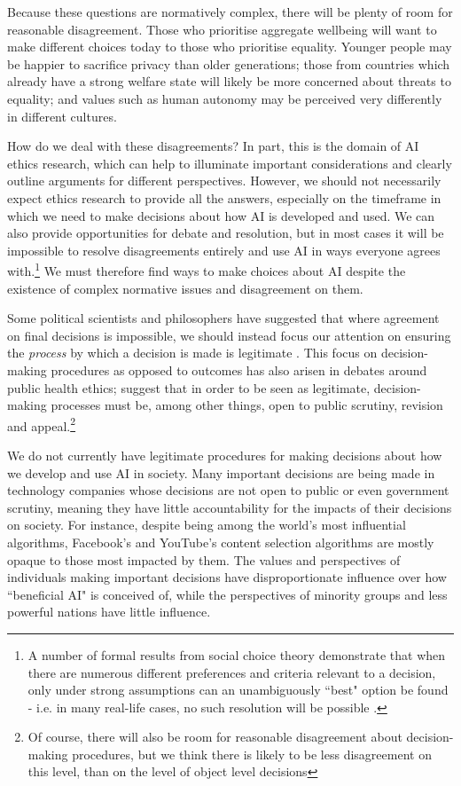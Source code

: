 \documentclass{article}
\begin{document}
Because these questions are normatively complex, there will be plenty of room for reasonable disagreement. Those who prioritise aggregate wellbeing will want to make different choices today to those who prioritise equality. Younger people may be happier to sacrifice privacy than older generations; those from countries which already have a strong welfare state will likely be more concerned about threats to equality; and values such as human autonomy may be perceived very differently in different cultures.

How do we deal with these disagreements? In part, this is the domain of AI ethics research, which can help to illuminate important considerations and clearly outline arguments for different perspectives. However, we should not necessarily expect ethics research to provide all the answers, especially on the timeframe in which we need to make decisions about how AI is developed and used. We can also provide opportunities for debate and resolution, but in most cases it will be impossible to resolve disagreements entirely and use AI in ways everyone agrees with.\footnote{A number of formal results from social choice theory demonstrate that when there are numerous different preferences and criteria relevant to a decision, only under strong assumptions can an unambiguously ``best" option be found - i.e. in many real-life cases, no such resolution will be possible \citep{patty_social_2014}.} We must therefore find ways to make choices about AI despite the existence of complex normative issues and disagreement on them.


Some political scientists and philosophers have suggested that where agreement on final decisions is impossible, we should instead focus our attention on ensuring the \textit{process} by which a decision is made is legitimate \citep{patty_social_2014}. This focus on decision-making procedures as opposed to outcomes has also arisen in debates around public health ethics; \citet{daniels_accountability_2008} suggest that in order to be seen as legitimate, decision-making processes must be, among other things, open to public scrutiny, revision and appeal.\footnote{Of course, there will also be room for reasonable disagreement about decision-making procedures, but we think there is likely to be less disagreement on this level, than on the level of object level decisions}

We do not currently have legitimate procedures for making decisions about how we develop and use AI in society. Many important decisions are being made in technology companies whose decisions are not open to public or even government scrutiny, meaning they have little accountability for the impacts of their decisions on society. For instance, despite being among the world’s most influential algorithms, Facebook’s and YouTube’s content selection algorithms are mostly opaque to those most impacted by them. The values and perspectives of individuals making important decisions have disproportionate influence over how ``beneficial AI" is conceived of, while the perspectives of minority groups and less powerful nations have little influence.
\end{document}
